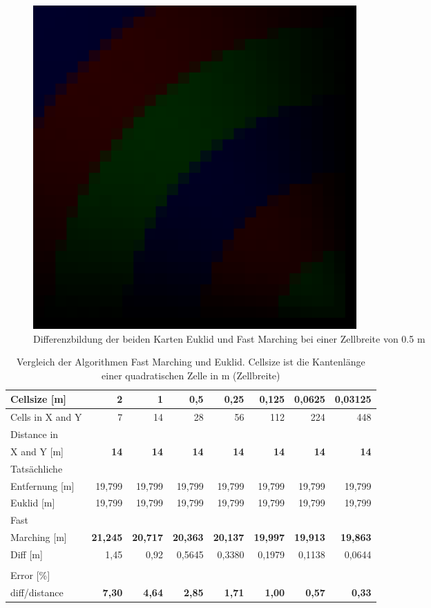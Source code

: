 \begin{figure}[htpb]
	\centering
  \includegraphics[width=0.6\textwidth]{abbildungen/vergleich_euklid_fast_marching/differenz_euklid_fm_0_05m.png}
	\caption{Differenzbildung der beiden Karten Euklid und Fast Marching bei einer Zellbreite von 0.5 m}
	\label{fig_fast_marching_euclid_difference_0_05m}
\end{figure}



\begin{table}[htbp]
\begin{tabular}{|l|r|r|r|r|r|r|r|}
\hline
Cellsize [m] & 2 & 1 & 0,5 & 0,25 & 0,125 & 0,0625 & 0,03125 \\ \hline
Cells in X and Y & 7 & 14 & 28 & 56 & 112 & 224 & 448 \\ \hline
Distance in  & & &  & &  & &\\ X and Y [m] & \textbf{14} & \textbf{14} & \textbf{14} & \textbf{14} & \textbf{14} & \textbf{14} & \textbf{14} \\ \hline
Tatsächliche & & &  & &  & &\\Entfernung [m] & 19,799 & 19,799 & 19,799 & 19,799 & 19,799 & 19,799 & 19,799 \\ \hline
Euklid [m] & 19,799 & 19,799 & 19,799 & 19,799 & 19,799 & 19,799 & 19,799 \\ \hline
Fast  & & &  & &  & &\\ Marching [m] & \textbf{21,245} & \textbf{20,717} & \textbf{20,363} & \textbf{20,137} & \textbf{19,997} & \textbf{19,913} & \textbf{19,863} \\ \hline
Diff [m] & 1,45 & 0,92 & 0,5645 & 0,3380 & 0,1979 & 0,1138 & 0,0644 \\ \hline
 & \multicolumn{1}{l|}{} & \multicolumn{1}{l|}{} & \multicolumn{1}{l|}{} & \multicolumn{1}{l|}{} & \multicolumn{1}{l|}{} & \multicolumn{1}{l|}{} & \multicolumn{1}{l|}{} \\ \hline
Error [\%]  & & &  & &  & &\\ diff/distance & \textbf{7,30} & \textbf{4,64} & \textbf{2,85} & \textbf{1,71} & \textbf{1,00} & \textbf{0,57} & \textbf{0,33} \\ \hline
\end{tabular}
\caption{Vergleich der Algorithmen Fast Marching und Euklid. Cellsize ist die Kantenlänge einer quadratischen Zelle in m (Zellbreite)}
\label{tab_euklid_fm_vergleich}
\end{table}


